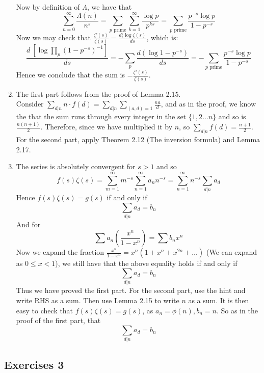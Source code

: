 \begin{enumerate}
    Now by definition of $\Lambda$, we have that
\begin{equation*}
\sum_{n=0}^{\infty}\frac{\Lambda(n)}{n^s}=\sum_{p \text{ prime}} \sum_{k=1}^{\infty}\frac{\log{p}}{p^{ks}} = \sum_{p \text{ prime}} \frac{p^{-s}\log{p}}{1-p^{-s}}
\end{equation*}
Now we may check that $\frac{\zeta'(s)}{\zeta(s)}=\frac{d(\log{\zeta(s)}}{ds}$, which is:
\begin{equation*} \frac{d~[\log {\prod_p (1-p^{-s})^{-1}}]}{ds}= - \sum_p \frac{d (\log{1-p^{-s}})}{ds} = - \sum_{p \text{ prime}} \frac{p^{-s}\log{p}}{1-p^{-s}}
\end{equation*}
Hence we conclude that the sum is $-\frac{\zeta'(s)}{\zeta(s)}$.
\item The first part follows from the proof of Lemma 2.15. \\
Consider $\sum_{d|n}n \cdot f(d) = \sum_{d|n} \sum_{(a,d)=1} \frac{na}{d}$, and as in the proof, we know the that the sum runs through every integer in the set $\{1,2 \ldots n\}$ and so is $\frac{n(n+1)}{2}$. Therefore, since we have multiplied it by $n$, so $\sum_{d|n}f(d)=\frac{n+1}{2}$.\\
For the second part, apply Theorem 2.12 (The inversion formula) and Lemma 2.17.
\item The series is absolutely convergent for $s>1$ and so
\begin{equation*}
f(s)\zeta(s)=\sum_{m=1}^{\infty} m^{-s} \sum_{n=1}^{\infty}a_n n^{-s} = \sum_{n=1}^{\infty} n^{-s} \sum_{d|n}a_d
\end{equation*}
Hence $f(s)\zeta(s)=g(s)$ if and only if $$ \sum_{d|n}a_d=b_n $$
And for
\begin{equation*}
\sum a_n \left(\frac{x^n}{1-x^n}\right)=\sum b_n x^n
\end{equation*}
Now we expand the fraction $\frac{x^n}{1-x^n} = x^n(1+x^n+x^{2n} +\ldots)$ (We can expand as $0 \le x<1$), we still have that the above equality holds if and only if $$ \sum_{d|n}a_d=b_n $$
Thus we have proved the first part. For the second part, use the hint and write RHS as a sum. Then use Lemma 2.15 to write $n$ as a sum. It is then easy to check that $f(s)\zeta(s)=g(s)$, as $a_n=\phi(n), b_n=n$. So as in the proof of the first part, that $$ \sum_{d|n}a_d=b_n $$
\end{enumerate}


\subsection{Exercises 3}

